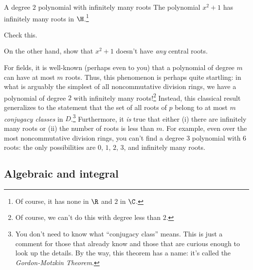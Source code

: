 \begin{exm}{A degree $2$ polynomial with infinitely many roots}{}
	The polynomial $x^2+1$ has infinitely many roots in $\H$.\footnote{Of course, it has none in $\R$ and $2$ in $\C$.}
	\begin{exr}[breakable=false]{}{}
		Check this.
	\end{exr}
	\begin{exr}[breakable=false]{}{}
		On the other hand, show that $x^2+1$ doesn't have \emph{any} central roots.
	\end{exr}
	\begin{rmk}
		For fields, it is well-known (perhaps even to you) that a polynomial of degree $m$ can have at most $m$ roots.  Thus, this phenomenon is perhaps quite startling:  in what is arguably the simplest of all noncommutative division rings, we have a polynomial of degree $2$ with infinitely many roots!\footnote{Of course, we can't do this with degree less than $2$.}  Instead, this classical result generalizes to the statement that the set of all roots of $p$ belong to at most $m$ \emph{conjugacy classes} in $D$.\footnote{You don't need to know what ``conjugacy class'' means.  This is just a comment for those that already know and those that are curious enough to look up the details.  By the way, this theorem has a name:  it's called the \emph{Gordon-Motzkin Theorem}.}  Furthermore, it \emph{is} true that either (i) there are infinitely many roots or (ii) the number of roots is less than $m$.  For example, even over the most noncommutative division rings, you can't find a degree $3$ polynomial with $6$ roots:  the only possibilities are $0$, $1$, $2$, $3$, and infinitely many roots.
	\end{rmk}
\end{exm}

\subsection{Algebraic and integral}

